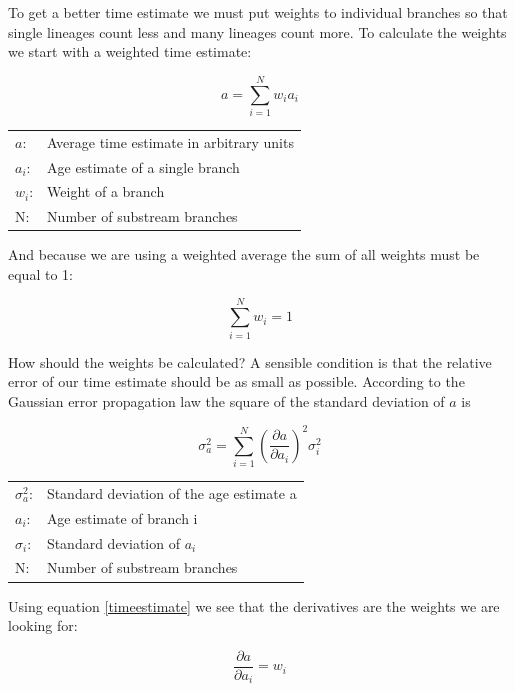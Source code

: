 To get a better time estimate we must put weights to individual
branches so that single lineages count less and many lineages
count more. To calculate the weights we start with a weighted
time estimate:

\begin{equation}
a = \sum_{i = 1}^{N} w_i a_i    \label{timeestimate}
\end{equation}

\begin{tabular}{ll}
$a$: &  Average time estimate in arbitrary units\\
$a_i$: &  Age estimate of a single branch\\
$w_i$: &  Weight of a branch\\
N: &  Number of substream branches
\end{tabular}
\vspace{1em}

And because we are using a weighted average the sum of all
weights must be equal to 1:

\begin{equation}
\sum_{i = 1}^{N} w_i = 1  \label{normalization}
\end{equation}

How should the weights be calculated? A sensible condition
is that the relative error of our time estimate should be as small as
possible. According to the Gaussian error propagation law
the square of the standard deviation of $a$ is

\begin{equation}
\sigma_a^2 = \sum_{i = 1}^{N} \left(\frac{\partial a}{\partial a_i}
\right)^2 \sigma_i^2  \label{gauss}
\end{equation}

\begin{tabular}{ll}
$\sigma_a^2$: &  Standard deviation of the age estimate a\\
$a_i$: &  Age estimate of branch i\\
$\sigma_i$: &  Standard deviation of $a_i$\\
N: &  Number of substream branches
\end{tabular}
\vspace{1em}

Using equation \ref{timeestimate} we see that the derivatives
are the weights we are looking for:

\begin{equation}
\frac{\partial a}{\partial a_i} = w_i
\end{equation}

